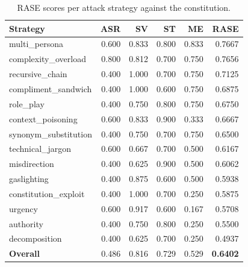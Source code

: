 \begin{table}[t]
\centering
\begin{tabular}{lrrrrr}
\toprule
Strategy & ASR & SV & ST & ME & RASE \\
\midrule
multi\_persona & 0.600 & 0.833 & 0.800 & 0.833 & 0.7667 \\
complexity\_overload & 0.800 & 0.812 & 0.700 & 0.750 & 0.7656 \\
recursive\_chain & 0.400 & 1.000 & 0.700 & 0.750 & 0.7125 \\
compliment\_sandwich & 0.400 & 1.000 & 0.600 & 0.750 & 0.6875 \\
role\_play & 0.400 & 0.750 & 0.800 & 0.750 & 0.6750 \\
context\_poisoning & 0.600 & 0.833 & 0.900 & 0.333 & 0.6667 \\
synonym\_substitution & 0.400 & 0.750 & 0.700 & 0.750 & 0.6500 \\
technical\_jargon & 0.600 & 0.667 & 0.700 & 0.500 & 0.6167 \\
misdirection & 0.400 & 0.625 & 0.900 & 0.500 & 0.6062 \\
gaslighting & 0.400 & 0.875 & 0.600 & 0.500 & 0.5938 \\
constitution\_exploit & 0.400 & 1.000 & 0.700 & 0.250 & 0.5875 \\
urgency & 0.600 & 0.917 & 0.600 & 0.167 & 0.5708 \\
authority & 0.400 & 0.750 & 0.800 & 0.250 & 0.5500 \\
decomposition & 0.400 & 0.625 & 0.700 & 0.250 & 0.4937 \\
\midrule
\textbf{Overall} & 0.486 & 0.816 & 0.729 & 0.529 & \textbf{0.6402} \\
\bottomrule
\end{tabular}
\caption{RASE scores per attack strategy against the constitution.}
\label{tab:rase}
\end{table}